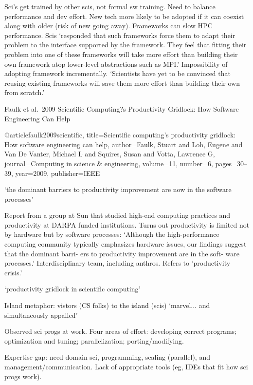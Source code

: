 \documentclass[12pt]{amsart}
\begin{document}
Sci's get trained by other scis, not formal sw training. Need to balance performance and dev effort. New tech more likely to be adopted if it can coexist along with older (risk of new going away). Frameworks can slow HPC performance. Scis `responded that such frameworks force them to adapt their problem to the interface supported by the framework. They feel that fitting their problem into one of these frameworks will take more effort than building their own framework atop lower-level abstractions such as MPI.' Impossibility of adopting framework incrementally. `Scientists have yet to be convinced that reusing existing frameworks will save them more effort than building their own from scratch.'






Faulk et al.\ 2009 Scientific Computing?s Productivity Gridlock: How Software Engineering Can Help

@article{faulk2009scientific,
  title={Scientific computing's productivity gridlock: How software engineering can help},
  author={Faulk, Stuart and Loh, Eugene and Van De Vanter, Michael L and Squires, Susan and Votta, Lawrence G},
  journal={Computing in science \& engineering},
  volume={11},
  number={6},
  pages={30--39},
  year={2009},
  publisher={IEEE}
}

`the dominant barriers to productivity improvement are now in the software processes'

Report from a group at Sun that studied high-end computing practices and productivity at DARPA funded institutions. Turns out productivity is limited not by hardware but by software processes: `Although the high-performance computing community typically emphasizes hardware issues, our findings suggest that the dominant barri- ers to productivity improvement are in the soft- ware processes.' Interdisciplinary team, including anthros. Refers to 'productivity crisis.' 

`productivity gridlock in scientific computing'

Island metaphor: vistors (CS folks) to the island (scis) `marvel... and simultaneously appalled'

Observed sci progs at work. Four areas of effort: developing correct programs; optimization and tuning; parallelization; porting/modifying. 

Expertise gap: need domain sci, programming, scaling (parallel), and management/communication. Lack of appropriate tools (eg, IDEs that fit how sci progs work). 
\end{document}
